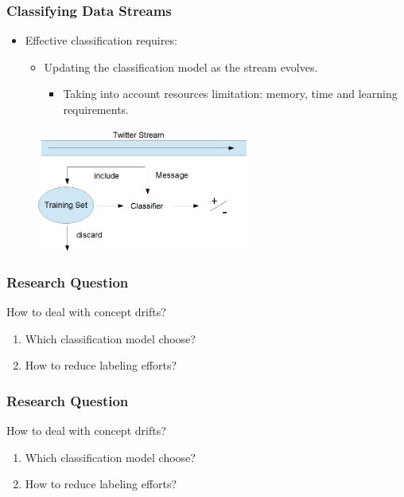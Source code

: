 \documentclass[14pt]{beamer}
\begin{document}
\begin{frame}\frametitle{Classifying Data Streams}

\begin{itemize}
\item Effective classification requires:
\begin{itemize}
\item Updating the classification model as the stream evolves.
\begin{itemize}
\item Taking into account resources limitation: memory, time and learning requirements.
\end{itemize}
\end{itemize}
\end{itemize}

\vspace{-0.2in}
\begin{figure}
\centering
\includegraphics[height=1.60in]{stream2}
\end{figure}
\end{frame}


\begin{frame}\frametitle{Research Question}

\centering
\large{How to deal with concept drifts?}
\vspace{0.5in}
\small{\begin{enumerate}
\item Which classification model choose?
\item How to reduce labeling efforts?
\end{enumerate}}
\end{frame}

\begin{frame}\frametitle{Research Question}

\centering
\large{How to deal with concept drifts?}
\vspace{0.5in}
\small{\begin{enumerate}
\item \alert{Which classification model choose?}
\item How to reduce labeling efforts?
\end{enumerate}}
\end{frame}
\end{document}
